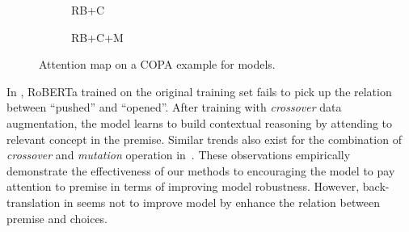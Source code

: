 \begin{figure}[th!]
\begin{subfigure}[b]{0.20\textwidth}
\caption{RB+C}
\label{fig:case_c}
\end{subfigure}
\hfill
\begin{subfigure}[b]{0.20\textwidth}
\centering
{}
\caption{RB+C+M}
\label{fig:case_cm}
\end{subfigure}
\caption{Attention map on a COPA example for models.}
\label{fig:case}
\end{figure}


In , 
RoBERTa trained on the original training set fails to pick up the 
relation between ``pushed'' and ``opened''. 
After training with \textit{crossover} data augmentation, 
the model learns to build contextual reasoning  
by attending to relevant concept in the premise. 
Similar trends also exist for the combination of \textit{crossover} 
and \textit{mutation} operation in~. 
These observations empirically demonstrate the effectiveness of our methods 
to encouraging the model to pay attention to premise in terms of improving model robustness.  
However, back-translation in  seems not to improve model by enhance the 
relation between premise and choices.

